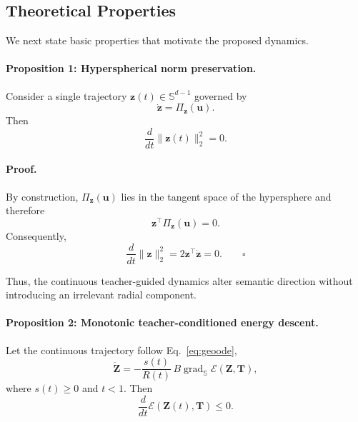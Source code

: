 \documentclass[11pt]{article}
\begin{document}
\subsection{Theoretical Properties}\label{sec:theory}

We next state basic properties that motivate the proposed dynamics.

\paragraph{Proposition 1: Hyperspherical norm preservation.}

Consider a single trajectory
$\mathbf{z}(t)\in\mathbb{S}^{d-1}$ governed by
\begin{equation}
    \dot{\mathbf{z}}
    =
    \Pi_{\mathbf{z}}(\mathbf{u}).
\end{equation}
Then
\begin{equation}
    \frac{d}{dt}
    \|\mathbf{z}(t)\|_2^2
    =
    0.
\end{equation}

\paragraph{Proof.}
By construction,
$\Pi_{\mathbf{z}}(\mathbf{u})$ lies in the tangent space of the
hypersphere and therefore
\begin{equation}
    \mathbf{z}^{\top}
    \Pi_{\mathbf{z}}(\mathbf{u})
    =
    0.
\end{equation}
Consequently,
\begin{equation}
    \frac{d}{dt}
    \|\mathbf{z}\|_2^2
    =
    2\mathbf{z}^{\top}\dot{\mathbf{z}}
    =
    0.
    \qquad \square
\end{equation}

Thus, the continuous teacher-guided dynamics alter semantic direction
without introducing an irrelevant radial component.


\paragraph{Proposition 2: Monotonic teacher-conditioned energy descent.}

Let the continuous trajectory follow Eq.~\eqref{eq:geoode},
\begin{equation}
    \dot{\mathbf{Z}}
    =
    -
    \frac{s(t)}{R(t)}
    \,B\operatorname{grad}_{\mathbb{S}}
    \mathcal{E}(\mathbf{Z},\mathbf{T}),
\end{equation}
where $s(t)\ge0$ and $t<1$. Then
\begin{equation}
    \frac{d}{dt}
    \mathcal{E}(\mathbf{Z}(t),\mathbf{T})
    \le0.
\end{equation}
\end{document}
